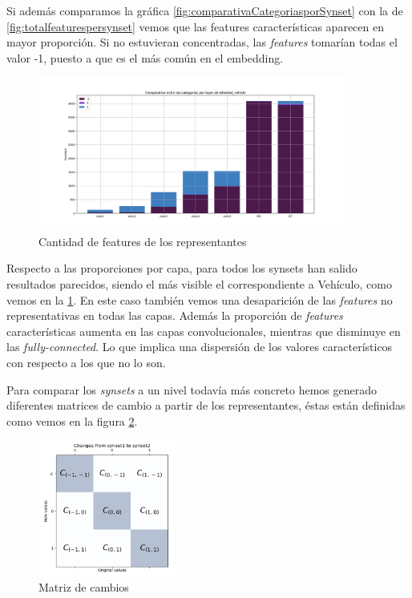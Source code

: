 \documentclass[12,twoside]{TFG-GM}
\theoremstyle{definition}
\theoremstyle{remark}
\begin{document}
Si además comparamos la gráfica \ref{fig:comparativaCategoriasporSynset} con la de \ref{fig:totalfeaturespersynset} vemos que las features características aparecen en mayor proporción. Si no estuvieran concentradas, las \textit{features} tomarían todas el valor -1, puesto a que es el más común en el embedding. 
\begin{figure}[ht] 
	\centering
	\includegraphics[width=0.9\textwidth] {Images/plots/25/synsetslayer/Comparative_of_synsets_wheeled_vehicle.png}
	\caption{ Cantidad de features de los representantes
	\label{fig:comparativaVehiculo}}
\end{figure}

Respecto a las proporciones por capa, para todos los synsets han salido resultados parecidos, siendo el más visible el correspondiente a Vehículo, como  vemos en la \ref{fig:comparativaVehiculo}. En este caso también vemos una desaparición de las \textit{features} no representativas en todas las capas. 
Además la proporción de \textit{features} características aumenta en las capas convolucionales, mientras que disminuye en las \textit{fully-connected}. Lo que implica una dispersión de los valores característicos con respecto a los que no lo son. 

Para comparar los \textit{synsets} a un nivel todavía más concreto hemos generado diferentes matrices de cambio a partir de los representantes, éstas están definidas como vemos en la figura \ref{fig:matrizss1ss2}. 
 \begin{figure}[ht] 
	\centering
	\includegraphics[width=0.4\textwidth] {Images/plots/25/matrices/Changesfromsynset1tosynset2.png}
	\caption{ Matriz de cambios
	\label{fig:matrizss1ss2}}
\end{figure}
\end{document}
